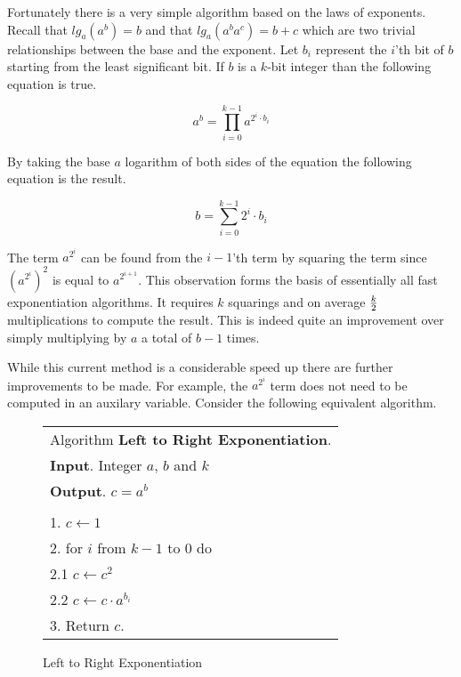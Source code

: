 \documentclass[b5paper]{book}
\begin{document}
Fortunately there is a very simple algorithm based on the laws of exponents.  Recall that $lg_a(a^b) = b$ and that $lg_a(a^ba^c) = b + c$ which
are two trivial relationships between the base and the exponent.  Let $b_i$ represent the $i$'th bit of $b$ starting from the least 
significant bit.  If $b$ is a $k$-bit integer than the following equation is true.

\begin{equation}
a^b = \prod_{i=0}^{k-1} a^{2^i \cdot b_i}
\end{equation}

By taking the base $a$ logarithm of both sides of the equation the following equation is the result.

\begin{equation}
b = \sum_{i=0}^{k-1}2^i \cdot b_i
\end{equation}

The term $a^{2^i}$ can be found from the $i - 1$'th term by squaring the term since $\left ( a^{2^i} \right )^2$ is equal to
$a^{2^{i+1}}$.  This observation forms the basis of essentially all fast exponentiation algorithms.  It requires $k$ squarings and on average
$k \over 2$ multiplications to compute the result.  This is indeed quite an improvement over simply multiplying by $a$ a total of $b-1$ times.

While this current method is a considerable speed up there are further improvements to be made.  For example, the $a^{2^i}$ term does not need to 
be computed in an auxilary variable.  Consider the following equivalent algorithm.

\begin{figure}[!here]
\begin{small}
\begin{center}
\begin{tabular}{l}
\hline Algorithm \textbf{Left to Right Exponentiation}. \\
\textbf{Input}.   Integer $a$, $b$ and $k$ \\
\textbf{Output}.  $c = a^b$ \\
\hline \\
1.  $c \leftarrow 1$ \\
2.  for $i$ from $k - 1$ to $0$ do \\
\hspace{3mm}2.1  $c \leftarrow c^2$ \\
\hspace{3mm}2.2  $c \leftarrow c \cdot a^{b_i}$ \\
3.  Return $c$. \\
\hline
\end{tabular}
\end{center}
\end{small}
\caption{Left to Right Exponentiation}
\label{fig:LTOR}
\end{figure}
\end{document}
